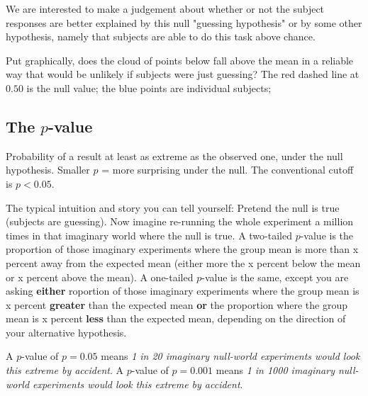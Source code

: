 \documentclass[11pt]{article}
\begin{document}
We are interested to make a judgement about whether or not the subject responses are better explained by this null "guessing hypothesis" or by some other hypothesis, namely that subjects are able to do this task above chance.

Put graphically, does the cloud of points below fall above the mean in a reliable way that would be unlikely if subjects were just guessing? The red dashed line at $0.50$ is the null value; the blue points are individual subjects;
\begin{center}
\end{center}

\subsection{The $p$-value}
Probability of a result at least as extreme as the observed one, under
the null hypothesis. Smaller $p$ = more surprising under the null. The
conventional cutoff is $p < 0.05$. 

The typical intuition and story you can tell yourself: Pretend the null is true (subjects are guessing). Now
imagine re-running the whole experiment a million times in that
imaginary world where the null is true. A two-tailed $p$-value is the proportion of those imaginary
experiments where the group mean is more than x percent away from the expected mean (either more the x percent below the mean or x percent above the mean).
A one-tailed $p$-value is the same, except you are asking \textbf{either} roportion of those imaginary
experiments where the group mean is x percent \textbf{greater} than the expected mean \textbf{or} the proportion where the group mean is x percent \textbf{less} than the expected mean, depending on the direction of your alternative hypothesis.

A $p$-value of $p = 0.05$ means \emph{1 in 20 imaginary null-world experiments would look this extreme by accident}.
A $p$-value of $p = 0.001$ means \emph{1 in 1000 imaginary null-world experiments would look this extreme by accident}.
\end{document}
